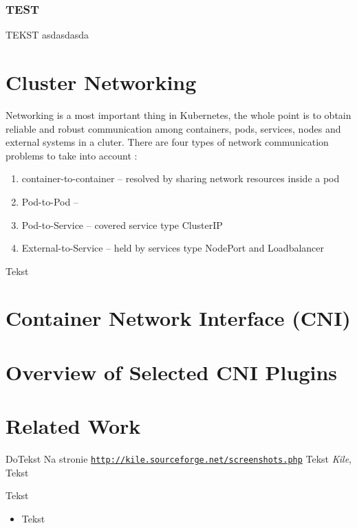 \subsubsection{TEST}
TEKST asdasdasda



\section{Cluster Networking}
\label{sec:k8s_networking}

Networking is a most important thing in Kubernetes, the whole point is to obtain reliable and robust communication among containers, pods, services, nodes and external systems in a cluter. There are four types of network communication problems to take into account \cite{KubernetesClusterNetworking}:

\begin{enumerate}
    \item container-to-container -- resolved by sharing network resources inside a pod
    \item Pod-to-Pod -- 
    \item Pod-to-Service -- covered service type ClusterIP
    \item External-to-Service -- held by services type NodePort and Loadbalancer
\end{enumerate}
Tekst


\section{Container Network Interface (CNI)}
\label{sec:cni_intro}





\section{Overview of Selected CNI Plugins}
\label{sec:cni_overview}

\section{Related Work}
\label{sec:realted_work}


DoTekst
Na stronie \underline{\texttt{http://kile.sourceforge.net/screenshots.php}} Tekst {\em Kile}, Tekst

Tekst

\begin{itemize}
\item Tekst
\end{itemize}
